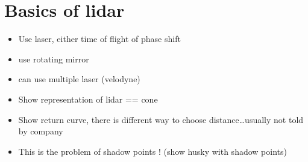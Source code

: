 \section{Basics of \gls{lidar}}
\label{sec:chap_lidar_intro}

\begin{itemize}
    \item Use laser, either time of flight of phase shift
    \item use rotating mirror
    \item can use multiple laser (velodyne)
    \item Show representation of lidar == cone
    \item Show return curve, there is different way to choose distance\dots usually not told by company
    \item This is the problem of shadow points ! (show husky with shadow points)
\end{itemize}
